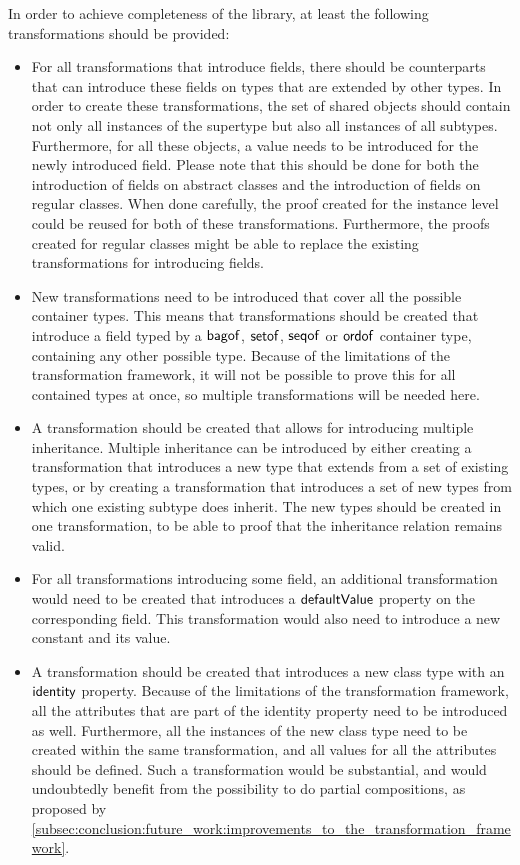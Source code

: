 In order to achieve completeness of the library, at least the following transformations should be provided:
\begin{itemize}
    \item For all transformations that introduce fields, there should be counterparts that can introduce these fields on types that are extended by other types. In order to create these transformations, the set of shared objects should contain not only all instances of the supertype but also all instances of all subtypes. Furthermore, for all these objects, a value needs to be introduced for the newly introduced field. Please note that this should be done for both the introduction of fields on abstract classes and the introduction of fields on regular classes. When done carefully, the proof created for the instance level could be reused for both of these transformations. Furthermore, the proofs created for regular classes might be able to replace the existing transformations for introducing fields.
    
    \item New transformations need to be introduced that cover all the possible container types. This means that transformations should be created that introduce a field typed by a $\mathsf{bagof}$, $\mathsf{setof}$, $\mathsf{seqof}$ or $\mathsf{ordof}$ container type, containing any other possible type. Because of the limitations of the transformation framework, it will not be possible to prove this for all contained types at once, so multiple transformations will be needed here.
    
    \item A transformation should be created that allows for introducing multiple inheritance. Multiple inheritance can be introduced by either creating a transformation that introduces a new type that extends from a set of existing types, or by creating a transformation that introduces a set of new types from which one existing subtype does inherit. The new types should be created in one transformation, to be able to proof that the inheritance relation remains valid.
    
    \item For all transformations introducing some field, an additional transformation would need to be created that introduces a $\mathsf{defaultValue}$ property on the corresponding field. This transformation would also need to introduce a new constant and its value.
    
    \item A transformation should be created that introduces a new class type with an $\mathsf{identity}$ property. Because of the limitations of the transformation framework, all the attributes that are part of the identity property need to be introduced as well. Furthermore, all the instances of the new class type need to be created within the same transformation, and all values for all the attributes should be defined. Such a transformation would be substantial, and would undoubtedly benefit from the possibility to do partial compositions, as proposed by \cref{subsec:conclusion:future_work:improvements_to_the_transformation_framework}.
    

\end{itemize}
